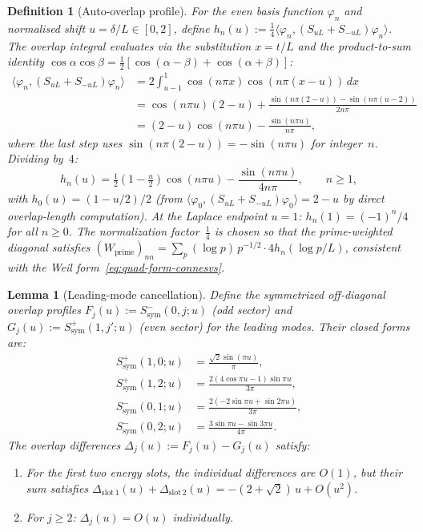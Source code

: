 \documentclass[11pt,a4paper]{article}
\newtheorem{lemma}[lemma]{Lemma}
\newtheorem{definition}[definition]{Definition}
\theoremstyle{remark}
\theoremstyle{plain}
\begin{document}
\begin{definition}[Auto-overlap profile]
\label{def:auto-overlap}
For the even basis function $\varphi_n$ and normalised shift $u=\delta/L\in[0,2]$,
define $h_n(u):=\tfrac14\langle\varphi_n,(S_{uL}+S_{-uL})\varphi_n\rangle$.
The overlap integral evaluates via the substitution $x=t/L$ and the
product-to-sum identity
$\cos\alpha\cos\beta=\tfrac12[\cos(\alpha-\beta)+\cos(\alpha+\beta)]$:
\begin{align*}
  \langle\varphi_n,(S_{uL}+S_{-uL})\varphi_n\rangle
  &= 2\int_{u-1}^{1}\cos(n\pi x)\cos(n\pi(x-u))\,dx \\
  &= \cos(n\pi u)(2-u)
    + \frac{\sin(n\pi(2-u))-\sin(n\pi(u-2))}{2n\pi} \\
  &= (2-u)\cos(n\pi u) - \frac{\sin(n\pi u)}{n\pi},
\end{align*}
where the last step uses $\sin(n\pi(2-u))=-\sin(n\pi u)$ for integer~$n$.
Dividing by~$4$:
\[
  h_n(u) = \tfrac{1}{2}(1-\tfrac{u}{2})\cos(n\pi u)
           - \frac{\sin(n\pi u)}{4n\pi},
  \qquad n\geq 1,
\]
with $h_0(u)=(1-u/2)/2$ (from $\langle\varphi_0,(S_{uL}+S_{-uL})\varphi_0\rangle
=2-u$ by direct overlap-length computation).
At the Laplace endpoint $u=1$: $h_n(1)=(-1)^n/4$ for all $n\geq 0$.
The normalization factor~$\tfrac14$ is chosen so that the prime-weighted diagonal
satisfies $(W_{\mathrm{prime}})_{nn}=\sum_p(\log p)\,p^{-1/2}\cdot 4h_n(\log p/L)$,
consistent with the Weil form~\eqref{eq:quad-form-connesvs}.
\end{definition}

\begin{lemma}[Leading-mode cancellation]
\label{lem:leading-cancel}
Define the symmetrized off-diagonal overlap profiles
$F_j(u):=S^-_{\mathrm{sym}}(0,j;u)$ (odd sector) and
$G_j(u):=S^+_{\mathrm{sym}}(1,j';u)$ (even sector) for the leading modes.
Their closed forms are:
\begin{align}
  S^+_{\mathrm{sym}}(1,0;u)
    &= \frac{\sqrt{2}\sin(\pi u)}{\pi}, \label{eq:Scos10} \\
  S^+_{\mathrm{sym}}(1,2;u)
    &= \frac{2(4\cos\pi u - 1)\sin\pi u}{3\pi}, \label{eq:Scos12} \\
  S^-_{\mathrm{sym}}(0,1;u)
    &= \frac{2(-2\sin\pi u + \sin 2\pi u)}{3\pi}, \label{eq:Ssin01} \\
  S^-_{\mathrm{sym}}(0,2;u)
    &= \frac{3\sin\pi u - \sin 3\pi u}{4\pi}. \label{eq:Ssin02}
\end{align}
The overlap differences $\Delta_j(u):=F_j(u)-G_j(u)$ satisfy:
\begin{enumerate}[label=\textup{(\alph*)}]
  \item For the first two energy slots, the individual differences are $O(1)$,
  but their sum satisfies
  $\Delta_{\mathrm{slot\,1}}(u) + \Delta_{\mathrm{slot\,2}}(u)
   = -(2+\sqrt{2})\,u + O(u^2)$.
  \item For $j\geq 2$: $\Delta_j(u)=O(u)$ individually.
\end{enumerate}
\end{lemma}
\end{document}
